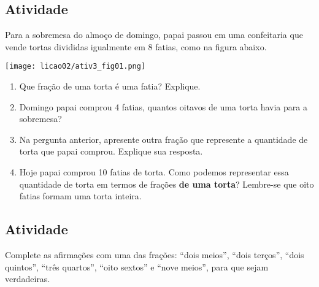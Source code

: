 \subsection{Atividade}

Para a sobremesa do almoço de domingo, papai passou em uma confeitaria que vende tortas divididas igualmente em 8 fatias, como na figura abaixo.
\begin{center}
\texttt{[image: licao02/ativ3\_fig01.png]}
\end{center}

\begin{enumerate} [\quad a)] %
  \item     Que fração de uma torta é uma fatia? Explique.
  \item     Domingo papai comprou 4 fatias, quantos oitavos de uma torta havia para a sobremesa?
  \item     Na pergunta anterior, apresente outra fração que represente a quantidade de torta que papai comprou. Explique sua resposta.
  \item     Hoje papai comprou 10 fatias de torta. Como podemos representar essa quantidade de torta em termos de frações {\bf  de uma torta}? Lembre-se que oito fatias formam uma torta inteira.
\end{enumerate} %

\subsection{Atividade}

Complete as afirmações com uma das frações: ``dois meios'', ``dois terços'', ``dois quintos'', ``três quartos'', ``oito sextos'' e ``nove meios'', para que sejam verdadeiras.

